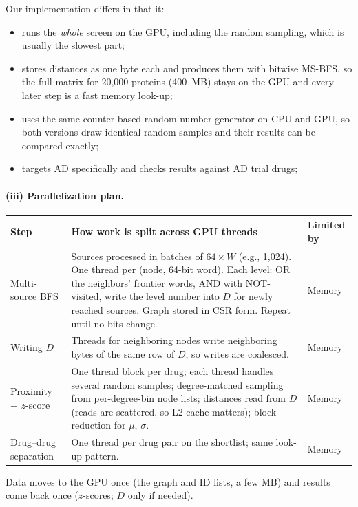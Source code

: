 Our implementation differs in that it:
\begin{itemize}[nosep]
  \item runs the \emph{whole} screen on the GPU, including the random sampling, which is usually the slowest part;
  \item stores distances as one byte each and produces them with bitwise MS-BFS, so the full matrix for 20{,}000 proteins (400~MB) stays on the GPU and every later step is a fast memory look-up;
  \item uses the same counter-based random number generator on CPU and GPU, so both versions draw identical random samples and their results can be compared exactly;
  \item targets AD specifically and checks results against AD trial drugs;
\end{itemize}

\paragraph{(iii) Parallelization plan.}
\begin{center}
\small
\begin{tabularx}{\linewidth}{@{}lXl@{}}
\toprule
Step & How work is split across GPU threads & Limited by \\
\midrule
Multi-source BFS & Sources processed in batches of $64\times W$ (e.g., 1{,}024). One thread per (node, 64-bit word). Each level: OR the neighbors' frontier words, AND with NOT-visited, write the level number into $D$ for newly reached sources. Graph stored in CSR form. Repeat until no bits change. & Memory \\
Writing $D$ & Threads for neighboring nodes write neighboring bytes of the same row of $D$, so writes are coalesced. & Memory \\
Proximity + $z$-score & One thread block per drug; each thread handles several random samples; degree-matched sampling from per-degree-bin node lists; distances read from $D$ (reads are scattered, so L2 cache matters); block reduction for $\mu$, $\sigma$. & Memory \\
Drug--drug separation & One thread per drug pair on the shortlist; same look-up pattern. & Memory \\
\bottomrule
\end{tabularx}
\end{center}
Data moves to the GPU once (the graph and ID lists, a few MB) and results come back once ($z$-scores; $D$ only if needed).

